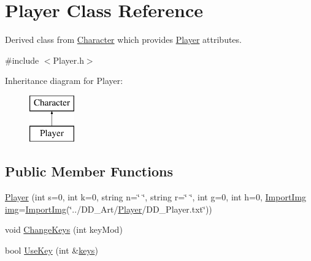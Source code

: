 \hypertarget{classPlayer}{\section{Player Class Reference}
\label{classPlayer}
}


Derived class from \hyperlink{classCharacter}{Character} which provides \hyperlink{classPlayer}{Player} attributes.  




{\ttfamily \#include $<$Player.\-h$>$}

Inheritance diagram for Player\-:\begin{figure}[H]
\begin{center}
\leavevmode
\includegraphics[height=2.000000cm]{classPlayer}
\end{center}
\end{figure}
\subsection*{Public Member Functions}
\begin{DoxyCompactItemize}
\item 
\hyperlink{classPlayer_a36d6f55c7bc6d95cf23d2439b9da19bb}{Player} (int s=0, int k=0, string n=\char`\"{} \char`\"{}, string r=\char`\"{} \char`\"{}, int g=0, int h=0, \hyperlink{classImportImg}{Import\-Img} \hyperlink{classCharacter_a3a0a90b2a43858b259912f659b8e0eea}{img}=\hyperlink{classImportImg}{Import\-Img}(\char`\"{}../D\-D\-\_\-\-Art/\hyperlink{classPlayer}{Player}/D\-D\-\_\-\-Player.\-txt\char`\"{}))
\item 
void \hyperlink{classPlayer_af2f60260add77e68519783dec5400a9f}{Change\-Keys} (int key\-Mod)
\item 
bool \hyperlink{classPlayer_af839bdc1524d571568ea31a34f44f3ab}{Use\-Key} (int \&\hyperlink{classPlayer_ac46baa685ca2a266178f03b9e9877e65}{keys})
\end{DoxyCompactItemize}
